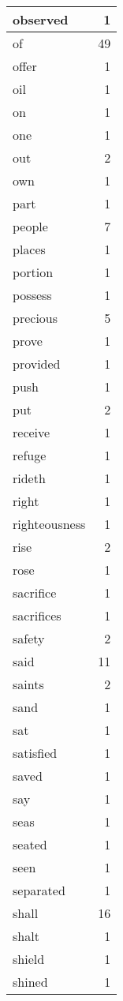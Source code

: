\begin{center}
\begin{longtable}{l|r}
observed & 1 \\ \hline
of & 49 \\ \hline
offer & 1 \\ \hline
oil & 1 \\ \hline
on & 1 \\ \hline
one & 1 \\ \hline
out & 2 \\ \hline
own & 1 \\ \hline
part & 1 \\ \hline
people & 7 \\ \hline
places & 1 \\ \hline
portion & 1 \\ \hline
possess & 1 \\ \hline
precious & 5 \\ \hline
prove & 1 \\ \hline
provided & 1 \\ \hline
push & 1 \\ \hline
put & 2 \\ \hline
receive & 1 \\ \hline
refuge & 1 \\ \hline
rideth & 1 \\ \hline
right & 1 \\ \hline
righteousness & 1 \\ \hline
rise & 2 \\ \hline
rose & 1 \\ \hline
sacrifice & 1 \\ \hline
sacrifices & 1 \\ \hline
safety & 2 \\ \hline
said & 11 \\ \hline
saints & 2 \\ \hline
sand & 1 \\ \hline
sat & 1 \\ \hline
satisfied & 1 \\ \hline
saved & 1 \\ \hline
say & 1 \\ \hline
seas & 1 \\ \hline
seated & 1 \\ \hline
seen & 1 \\ \hline
separated & 1 \\ \hline
shall & 16 \\ \hline
shalt & 1 \\ \hline
shield & 1 \\ \hline
shined & 1 \\ \hline

\end{longtable}
\end{center}
